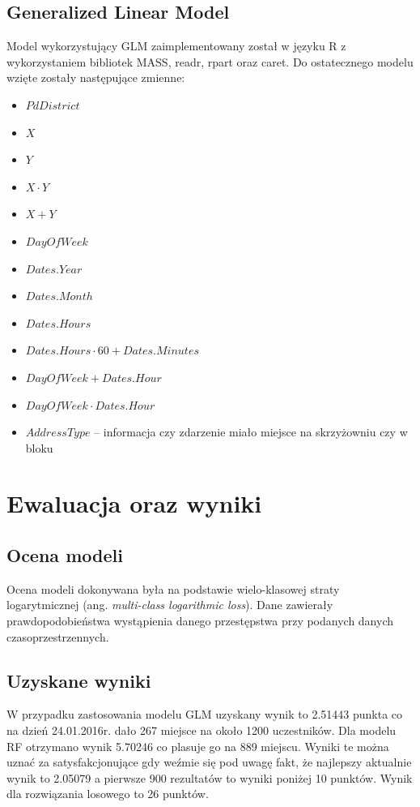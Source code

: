 \documentclass[11pt]{article} %
\begin{document}
\subsection{Generalized Linear Model}

Model wykorzystujący GLM zaimplementowany został w języku R z wykorzystaniem bibliotek MASS, readr, rpart oraz caret. Do ostatecznego modelu wzięte zostały następujące zmienne:

\begin{itemize}
\item $PdDistrict$
\item $X $
\item $Y $
\item $X \cdot Y$
\item $X + Y$ 
\item $DayOfWeek$
\item $Dates.Year $
\item $Dates.Month $
\item $Dates.Hours $
\item $Dates.Hours \cdot 60 + Dates.Minutes$ 
\item $DayOfWeek + Dates.Hour $
\item $DayOfWeek \cdot Dates.Hour $
\item $AddressType $ -- informacja czy zdarzenie miało miejsce na skrzyżowniu czy w bloku

\end{itemize}


\section{Ewaluacja oraz wyniki}

\subsection{Ocena modeli}

Ocena modeli dokonywana była na podstawie wielo-klasowej straty logarytmicznej (ang. \textit{multi-class logarithmic loss}). Dane zawierały prawdopodobieństwa wystąpienia danego przestępstwa przy podanych danych czasoprzestrzennych. \\

\subsection{Uzyskane wyniki}


W przypadku zastosowania modelu GLM uzyskany wynik to 2.51443 punkta co na dzień 24.01.2016r. dało 267 miejsce na około 1200 uczestników. Dla modelu RF otrzymano wynik 5.70246 co plasuje go na 889 miejscu. Wyniki te można uznać za satysfakcjonujące gdy weźmie się pod uwagę fakt, że najlepszy aktualnie wynik to 2.05079 a pierwsze 900 rezultatów to wyniki poniżej 10 punktów. Wynik dla rozwiązania losowego to 26 punktów. \\
\end{document}
